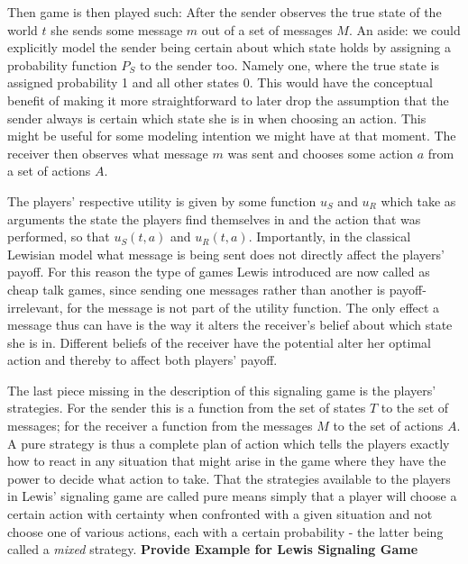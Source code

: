 \documentclass{article}
\begin{document}
Then game is then played such: After the sender observes the true state of the world $t$ she sends some message $m$ out of a set of messages $M$. An aside: we could explicitly model the sender being certain about which state holds by assigning a probability function $P_S$ to the sender too. Namely one, where the true state is assigned probability 1 and all other states 0. This would have the conceptual benefit of making it more straightforward to later drop the assumption that the sender always is certain which state she is in when choosing an action. This might be useful for some modeling intention we might have at that moment. The receiver then observes what message $m$ was sent and chooses some action $a$ from a set of actions $A$.

The players' respective utility is given by some function $u_S$ and $u_R$ which take as arguments the state the players find themselves in and the action that was performed, so that $u_S(t,a)$ and $u_R(t,a)$. Importantly, in the classical Lewisian model what message is being sent does not directly affect the players' payoff. For this reason the type of games Lewis introduced are now called as cheap talk games, since sending one messages rather than another is payoff-irrelevant, for the message is not part of the utility function. The only effect a message thus can have is the way it alters the receiver's belief about which state she is in. Different beliefs of the receiver have the potential alter her optimal action and thereby to affect both players' payoff.

The last piece missing in the description of this signaling game is the players' strategies. For the sender this is a function from the set of states $T$ to the set of messages; for the receiver a function from the messages $M$ to the set of actions $A$. A pure strategy is thus a complete plan of action which tells the players exactly how to react in any situation that might arise in the game where they have the power to decide what action to take. That the strategies available to the players in Lewis' signaling game are called pure means simply that a player will choose a certain action with certainty when confronted with a given situation and not choose one of various actions, each with a certain probability - the latter being called a \textit{mixed} strategy.
\textbf{Provide Example for Lewis Signaling Game}
\end{document}
